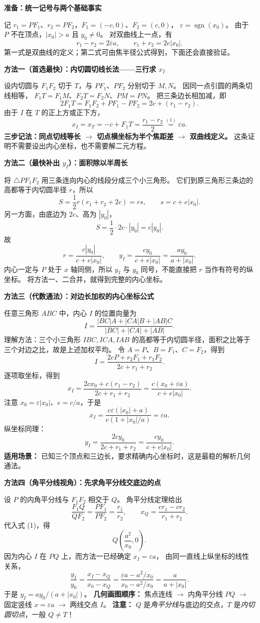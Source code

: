 \begin{proofbox}
\textbf{准备：统一记号与两个基础事实}

记 $r_1=PF_1$、$r_2=PF_2$，$F_1=(-c,0)$、$F_2=(c,0)$，
$\varepsilon=\operatorname{sgn}(x_0)$。
由于 $P$ 不在顶点，$|x_0|>a$ 且 $y_0\ne0$。
对双曲线上一点，有
\[
\boxed{r_1-r_2=2\varepsilon a},\qquad
\boxed{r_1+r_2=2e|x_0|}.
\tag{1}
\]
第一式是双曲线的定义；第二式可由焦半径公式得到，下面还会直接验证。

\textbf{方法一（首选最快）：内切圆切线长法——三行求 $x_I$}

设内切圆与 $F_1F_2$ 切于 $T$，与 $PF_1$、$PF_2$ 分别切于 $M,N$。
因同一点引圆的两条切线相等，
$F_1T=F_1M$、$F_2T=F_2N$、$PM=PN$。
把三条边长相加减，即
\[
2F_1T=F_1F_2+PF_1-PF_2=2c+(r_1-r_2).
\]
由于 $I$ 在 $T$ 的正上方或正下方，
\[
\boxed{x_I=x_T=-c+F_1T=\frac{r_1-r_2}{2}}
\overset{(1)}{=}\boxed{\varepsilon a}.
\]
\textbf{三步记法：同点切线等长 $\rightarrow$ 切点横坐标为半个焦距差 $\rightarrow$ 双曲线定义。}
这条证明不需要设出内心坐标，也不需要解二元方程。

\textbf{方法二（最快补出 $y_I$）：面积除以半周长}

将 $\triangle PF_1F_2$ 用三条连向内心的线段分成三个小三角形。
它们到原三角形三条边的高都等于内切圆半径 $r$，所以
\[
S=\frac12r(r_1+r_2+2c)=rs,\qquad s=c+e|x_0|.
\]
另一方面，由底边为 $2c$、高为 $|y_0|$，
\[
S=\frac12\cdot2c\cdot|y_0|=c|y_0|.
\]
故
\[
r=\frac{c|y_0|}{c+e|x_0|},\qquad
\boxed{y_I=\frac{cy_0}{c+e|x_0|}
=\frac{ay_0}{a+|x_0|}}.
\]
内心一定与 $P$ 处于 $x$ 轴同侧，所以 $y_I$ 与 $y_0$ 同号，不能直接把 $r$ 当作有符号的纵坐标。
将方法一、二合并，就得到完整的内心坐标。

\tcbline
\textbf{方法三（代数通法）：对边长加权的内心坐标公式}

任意三角形 $ABC$ 中，内心 $I$ 的位置向量为
\[
I=\frac{|BC|A+|CA|B+|AB|C}{|BC|+|CA|+|AB|}.
\]
理解方法：三个小三角形 $IBC,ICA,IAB$ 的高都等于内切圆半径，面积之比等于三个对边之比，故是上述加权平均。
令 $A=P$、$B=F_1$、$C=F_2$，得到
\[
I=\frac{2cP+r_2F_1+r_1F_2}{2c+r_1+r_2}.
\]
逐项取坐标，得到
\[
x_I=\frac{2cx_0+c(r_1-r_2)}{2c+r_1+r_2}
=\frac{c(x_0+\varepsilon a)}{c+e|x_0|}.
\]
注意 $x_0=\varepsilon|x_0|$、$e=c/a$，于是
\[
x_I=\frac{c\varepsilon(|x_0|+a)}{c(1+|x_0|/a)}
=\varepsilon a.
\]
纵坐标同理：
\[
y_I=\frac{2cy_0}{2c+r_1+r_2}
=\frac{cy_0}{c+e|x_0|}.
\]
\textbf{适用场景：} 已知三个顶点和三边长，要求精确内心坐标时，这是最稳的解析几何通法。

\textbf{方法四（角平分线视角）：先求角平分线交底边的点}

设 $P$ 的内角平分线与 $F_1F_2$ 相交于 $Q$。
角平分线定理给出
\[
\frac{F_1Q}{QF_2}=\frac{PF_1}{PF_2}=\frac{r_1}{r_2},\qquad
x_Q=\frac{cr_1-cr_2}{r_1+r_2}.
\]
代入式 (1)，得
\[
\boxed{Q\left(\frac{a^2}{x_0},0\right)}.
\]
因为内心 $I$ 在 $PQ$ 上，而方法一已经确定 $x_I=\varepsilon a$，
由同一直线上纵坐标的线性关系，
\[
\frac{y_I}{y_0}=
\frac{x_I-x_Q}{x_0-x_Q}
=\frac{\varepsilon a-a^2/x_0}{x_0-a^2/x_0}
=\frac{a}{a+|x_0|}.
\]
于是 $y_I=ay_0/(a+|x_0|)$。
\textbf{几何画图顺序：} 焦点连线 $\rightarrow$ 内角平分线 $PQ$
$\rightarrow$ 固定竖线 $x=\varepsilon a$ $\rightarrow$ 两线交点 $I$。
\textbf{注意：} $Q$ 是\emph{角平分线}与底边的交点，$T$ 是\emph{内切圆切点}，一般 $Q\ne T$！


\end{proofbox}
